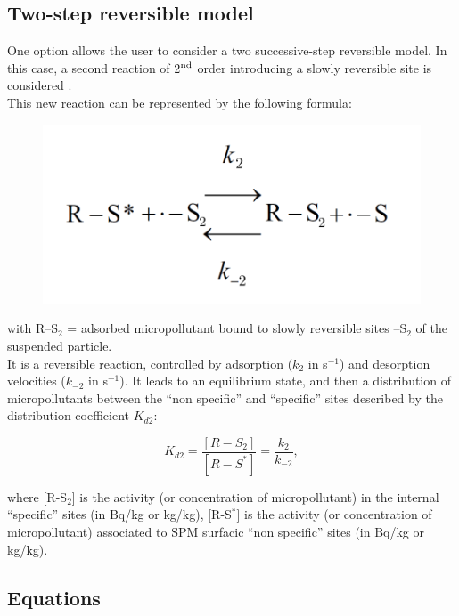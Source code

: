 \subsection{Two-step reversible model}

One option allows the user to consider a two successive-step reversible model.
In this case, a second reaction of 2$^{\rm{nd}}$ order introducing a slowly
reversible site is considered \cite{ciffroy2001kinetics}. \\

This new reaction can be represented by the following formula:

\begin{figure}[H]
  \centering
  \includegraphics[scale=0.4]{graphics/image61.png}
\end{figure}

with R–S$_{2}$ = adsorbed micropollutant bound to slowly reversible sites –S$_{2}$
of the suspended particle.\\

It is a reversible reaction, controlled by adsorption ($k_2$ in s$^{-1}$)
and desorption velocities ($k_{-2}$ in s$^{-1}$).
It leads to an equilibrium state, and then a distribution of micropollutants
between the ``non specific'' and ``specific'' sites described
by the distribution coefficient $K_{d2}$:

\begin{equation}
  K_{d2} = \frac{[R-S_2]}{[R-S^\ast]} = \frac{k_2}{k_{-2}},
\end{equation}

where [R-S$_2$] is the activity (or concentration of micropollutant)
in the internal ``specific'' sites (in Bq/kg or kg/kg), [R-S$^\ast$] is the activity
(or concentration of micropollutant) associated to SPM surfacic
``non specific'' sites (in Bq/kg or kg/kg).\\


\subsection{Equations}

